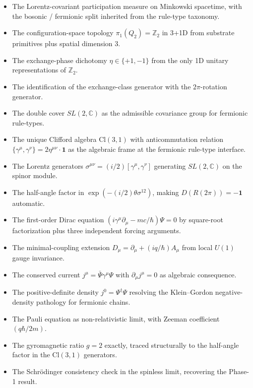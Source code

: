 \documentclass[11pt,a4paper]{article}
\begin{document}
\begin{itemize}[noitemsep]
  \item The Lorentz-covariant participation measure on Minkowski spacetime, with the bosonic / fermionic split inherited from the rule-type taxonomy.
  \item The configuration-space topology $\pi_1(Q_2) = \mathbb{Z}_2$ in 3+1D from substrate primitives plus spatial dimension 3.
  \item The exchange-phase dichotomy $\eta \in \{+1, -1\}$ from the only 1D unitary representations of $\mathbb{Z}_2$.
  \item The identification of the exchange-class generator with the $2\pi$-rotation generator.
  \item The double cover $SL(2, \mathbb{C})$ as the admissible covariance group for fermionic rule-types.
  \item The unique Clifford algebra $\mathrm{Cl}(3,1)$ with anticommutation relation $\{\gamma^\mu, \gamma^\nu\} = 2\eta^{\mu\nu}\cdot\mathbf{1}$ as the algebraic frame at the fermionic rule-type interface.
  \item The Lorentz generators $\sigma^{\mu\nu} = (i/2)[\gamma^\mu, \gamma^\nu]$ generating $SL(2, \mathbb{C})$ on the spinor module.
  \item The half-angle factor in $\exp(-(i/2)\theta\sigma^{12})$, making $D(R(2\pi)) = -\mathbf{1}$ automatic.
  \item The first-order Dirac equation $(i\gamma^\mu\partial_\mu - mc/\hbar)\Psi = 0$ by square-root factorization plus three independent forcing arguments.
  \item The minimal-coupling extension $D_\mu = \partial_\mu + (iq/\hbar)A_\mu$ from local $U(1)$ gauge invariance.
  \item The conserved current $j^\mu = \bar\Psi\gamma^\mu\Psi$ with $\partial_\mu j^\mu = 0$ as algebraic consequence.
  \item The positive-definite density $j^0 = \Psi^\dagger\Psi$ resolving the Klein--Gordon negative-density pathology for fermionic chains.
  \item The Pauli equation as non-relativistic limit, with Zeeman coefficient $(q\hbar/2m)$.
  \item The gyromagnetic ratio $g = 2$ exactly, traced structurally to the half-angle factor in the $\mathrm{Cl}(3,1)$ generators.
  \item The Schr\"odinger consistency check in the spinless limit, recovering the Phase-1 result.
\end{itemize}
\end{document}
